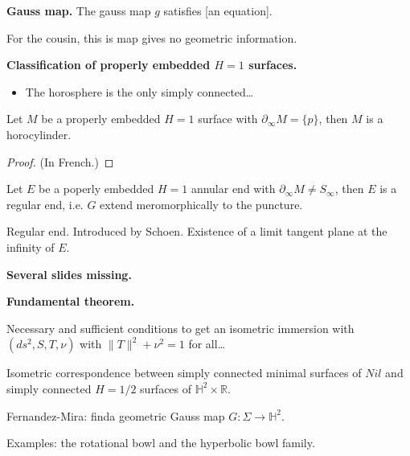 \medskip\noindent
{\bf Gauss map.} The gauss map $g$ satisfies
[an equation].

For the cousin, this is map gives no
geometric information.

\medskip\noindent
{\bf Classification of properly
embedded $H=1$ surfaces.}
\begin{theorem}
\label{theorem-cr01}
\begin{itemize}
\item The horosphere is the only simply
connected…
\end{itemize}
\end{theorem}

\begin{proposition}[Collin,-,R 01]
\label{proposition-cr01}
Let $M$ be a properly embedded $H=1$ surface
with $\partial_\infty M=\{p\}$, then $M$
is a horocylinder.
\end{proposition}

\begin{proof}
(In French.)
\end{proof}

\begin{proposition}
\label{proposition-cr01-2}
Let $E$ be a poperly embedded $H=1$
annular end with $\partial_\infty M \neq 
S_{\infty}$, then $E$ is a regular end,
i.e. $G$ extend meromorphically to the
puncture.
\end{proposition}

\noindent
Regular end. Introduced by Schoen.
Existence of a limit tangent plane
at the infinity of $E$.


\medskip\noindent
{\bf Several slides missing.}

 \medskip\noindent
{\bf Fundamental theorem.}

\begin{theorem}[Daniel]
\label{theorem-daniel}
Necessary and sufficient conditions
to get an isometric immersion with
$(ds^2,S,T,\nu)$ with $\|T\|^2+\nu^2=1$
for all…
\end{theorem}

\begin{theorem}[Daniel, 2007]
\label{theorem-daniel7}
Isometric correspondence between simply
connected minimal surfaces of $Nil$ and
simply connected $H=1/2$ surfaces of
$\mathbb{H}^2\times\mathbb{R}$.
\end{theorem}

\noindent
Fernandez-Mira: finda  geometric Gauss map 
$G:\Sigma \to \mathbb{H}^2$.

Examples: the rotational bowl 
and the hyperbolic bowl family.


